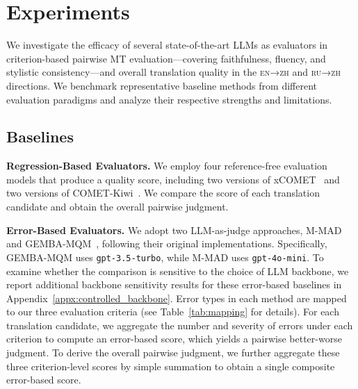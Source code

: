 \documentclass{article}
\theoremstyle{plain}
\theoremstyle{definition}
\theoremstyle{remark}
\begin{document}
\section{Experiments}
\label{sec:experiments}
We investigate the efficacy of several state-of-the-art LLMs as evaluators in criterion-based pairwise MT evaluation—covering faithfulness, fluency, and stylistic consistency—and overall translation quality in the \textsc{en→zh} and \textsc{ru→zh} directions. We benchmark representative baseline methods from different evaluation paradigms and analyze their respective strengths and limitations.

\subsection{Baselines}\label{sec:baselines}
\noindent
\textbf{Regression-Based Evaluators.} We employ four reference-free evaluation models that produce a quality score, including two versions of xCOMET~\citep{Guerreiro2023xcometTM} and two versions of COMET-Kiwi~\citep{Rei2023ScalingUC}. We compare the score of each translation candidate and obtain the overall pairwise judgment. 

\noindent
\textbf{Error-Based Evaluators.}
We adopt two LLM-as-judge approaches, M-MAD~\citep{M-MAD} and GEMBA-MQM~\citep{GEMBA}, following their original implementations. Specifically, GEMBA-MQM uses \texttt{gpt-3.5-turbo}, while M-MAD uses \texttt{gpt-4o-mini}. To examine whether the comparison is sensitive to the choice of LLM backbone, we report additional backbone sensitivity results for these error-based baselines in Appendix~\ref{appx:controlled_backbone}. Error types in each method are mapped to our three evaluation criteria (see Table~\ref{tab:mapping} for details). For each translation candidate, we aggregate the number and severity of errors under each criterion to compute an error-based score, which yields a pairwise better-worse judgment. To derive the overall pairwise judgment, we further aggregate these three criterion-level scores by simple summation to obtain a single composite error-based score.


\end{document}
